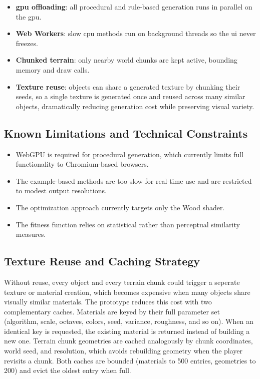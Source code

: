 \begin{itemize}[noitemsep, topsep=0pt]
    \item \textbf{\gls{gpu} offloading}: all procedural and rule-based generation runs in parallel on the \gls{gpu}.
    \item \textbf{Web Workers}: slow \gls{cpu} methods run on background threads so the \gls{ui} never freezes.
    \item \textbf{Chunked terrain}: only nearby world chunks are kept active, bounding memory and draw calls.
    \item \textbf{Texture reuse}: objects can share a generated texture by chunking their seeds, so a single texture is generated once and reused across many similar objects, dramatically reducing generation cost while preserving visual variety.
\end{itemize}

\subsection{Known Limitations and Technical Constraints}

\begin{itemize}
    \item WebGPU is required for procedural generation, which currently limits full functionality to Chromium-based browsers.
    \item The example-based methods are too slow for real-time use and are restricted to modest output resolutions.
    \item The optimization approach currently targets only the Wood shader.
    \item The fitness function relies on statistical rather than perceptual similarity measures.
\end{itemize}

\subsection{Texture Reuse and Caching Strategy}

Without reuse, every object and every terrain chunk could trigger a seperate texture or material creation, which becomes expensive when many objects share visually similar materials. The prototype reduces this cost with two complementary caches. Materials are keyed by their full parameter set (algorithm, scale, octaves, colors, seed, variance, roughness, and so on). When an identical key is requested, the existing material is returned instead of building a new one. Terrain chunk geometries are cached analogously by chunk coordinates, world seed, and resolution, which avoids rebuilding geometry when the player revisits a chunk. Both caches are bounded (materials to 500 entries, geometries to 200) and evict the oldest entry when full.

